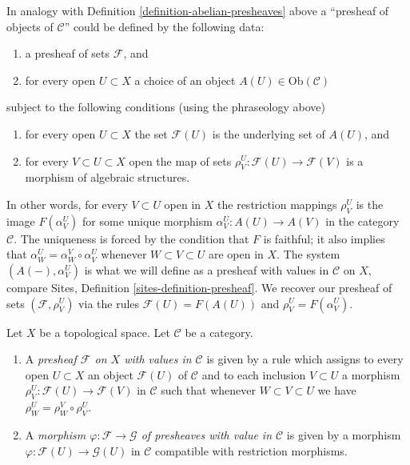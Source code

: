 \medskip\noindent
In analogy with Definition \ref{definition-abelian-presheaves}
above a ``presheaf of objects of $\mathcal{C}$'' could be
defined by the following data:
\begin{enumerate}
\item a presheaf of sets $\mathcal{F}$, and
\item for every open $U \subset X$ a choice
of an object $A(U) \in \text{Ob}(\mathcal{C})$
\end{enumerate}
subject to the following conditions (using the phraseology above)
\begin{enumerate}
\item for every open $U \subset X$ the set $\mathcal{F}(U)$
is the underlying set of $A(U)$, and
\item for every $V \subset U \subset X$ open
the map of sets $\rho_V^U: \mathcal{F}(U) \to \mathcal{F}(V)$
is a morphism of algebraic structures.
\end{enumerate}
In other words, for every $V \subset U$ open in $X$
the restriction mappings $\rho^U_V$ is the image
$F(\alpha^U_V)$ for some unique morphism
$\alpha^U_V : A(U) \to A(V)$ in the category $\mathcal{C}$.
The uniqueness is forced by the condition that $F$ is
faithful; it also implies that
$\alpha^U_W = \alpha^V_W \circ \alpha^U_V$
whenever $W \subset V \subset U$ are open in $X$.
The system $(A(-), \alpha^U_V)$ is what we will define as a
presheaf with values in $\mathcal{C}$ on $X$, compare
Sites, Definition \ref{sites-definition-presheaf}.
We recover our presheaf of sets $(\mathcal{F}, \rho_V^U)$
via the rules $\mathcal{F}(U) = F(A(U))$ and
$\rho_V^U = F(\alpha_V^U)$.

\begin{definition}
\label{definition-prefsheaf-values-in-category}
Let $X$ be a topological space.
Let $\mathcal{C}$ be a category.
\begin{enumerate}
\item A {\it presheaf $\mathcal{F}$ on $X$ with values in $\mathcal{C}$}
is given by a rule which assigns to every open $U \subset X$
an object $\mathcal{F}(U)$ of $\mathcal{C}$
and to each inclusion $V \subset U$
a morphism $\rho_V^U : \mathcal{F}(U) \to \mathcal{F}(V)$
in $\mathcal{C}$ such that whenever $W \subset V \subset U$
we have $\rho_W^U = \rho_W^V \circ \rho_V^U$.
\item A {\it morphism $\varphi : \mathcal{F} \to \mathcal{G}$
of presheaves with value in $\mathcal{C}$} is given by a
morphism $\varphi : \mathcal{F}(U) \to \mathcal{G}(U)$
in $\mathcal{C}$ compatible with restriction morphisms.
\end{enumerate}
\end{definition}


